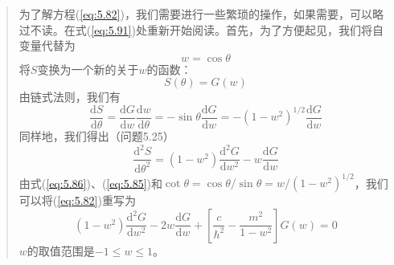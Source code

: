     \begin{quote}
        \small
        \noindent 为了解方程(\ref{eq:5.82})，我们需要进行一些繁琐的操作，如果需要，可以略过不读。在式(\ref{eq:5.91})处重新开始阅读。首先，为了方便起见，我们将自变量代替为
        \begin{equation}
            w = \cos\theta
            \label{eq:5.83}
        \end{equation}
        将$S$变换为一个新的关于$w$的函数：
        \begin{equation}
            S\left(\theta\right) = G\left(w\right)
            \label{eq:5.84}
        \end{equation}
        由链式法则，我们有
        \begin{equation}
            \frac{\mathrm{d}S}{\mathrm{d}\theta} = \frac{\mathrm{d}G}{\mathrm{d}w}\frac{\mathrm{d}w}{\mathrm{d}\theta} = -\sin\theta\frac{\mathrm{d}G}{\mathrm{d}w} = -\left(1-w^2\right)^{1/2}\frac{\mathrm{d}G}{\mathrm{d}w}
            \label{eq:5.85}
        \end{equation}
        同样地，我们得出（问题5.25）
        \begin{equation}
            \frac{\mathrm{d}^2S}{\mathrm{d}\theta^2} = \left(1-w^2\right)\frac{\mathrm{d}^2G}{\mathrm{d}w^2} - w\frac{\mathrm{d}G}{\mathrm{d}w}
            \label{eq:5.86}
        \end{equation}
        由式(\ref{eq:5.86})、(\ref{eq:5.85})和$\cot\theta = \cos\theta/\sin\theta = w/\left(1-w^2\right)^{1/2}$，我们可以将(\ref{eq:5.82})重写为
        \begin{equation}
            \left(1-w^2\right)\frac{\mathrm{d}^2G}{\mathrm{d}w^2} - 2w\frac{\mathrm{d}G}{\mathrm{d}w}+\left[\frac{c}{\hbar^2}-\frac{m^2}{1-w^2}\right]G\left(w\right) = 0
            \label{eq:5.87}
        \end{equation}
        $w$的取值范围是$-1 \le w \le 1$。


\end{quote}
